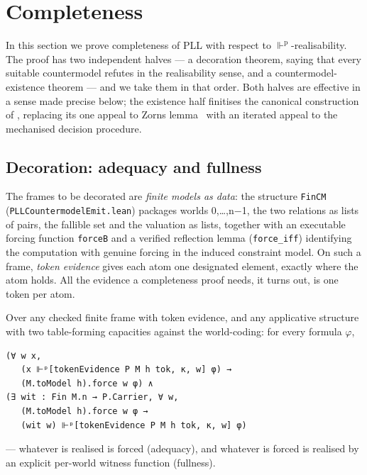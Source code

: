 \section{Completeness}\label{6-completeness}

In this section we prove completeness of PLL with respect to
\ensuremath{\Vdash^{\mathrm{p}}}-realisability. The proof has two independent halves --- a decoration
theorem, saying that every suitable countermodel refutes in the
realisability sense, and a countermodel-existence theorem --- and we take
them in that order. Both halves are effective in a sense made precise
below; the existence half finitises the canonical construction of
\cite[\S4]{FairtloughMendler1997}, replacing its one appeal to
Zorn\textquotesingle s lemma~\cite{Zorn1935} with an iterated appeal to the
mechanised decision procedure.

\subsection{Decoration: adequacy and fullness}\label{61-decoration-adequacy-and-fullness}

The frames to be decorated are \emph{finite models as data}: the structure
\texttt{FinCM} (\texttt{PLLCountermodelEmit.lean}) packages worlds 0,\ldots,n\ensuremath{-}1, the two
relations as lists of pairs, the fallible set and the valuation as
lists, together with an executable forcing function \texttt{forceB} and a
verified reflection lemma (\texttt{force\_iff}) identifying the computation
with genuine forcing in the induced constraint model. On such a frame,
\emph{token evidence} gives each atom one designated element, exactly where
the atom holds. All the evidence a completeness proof needs, it turns
out, is one token per atom.

\begin{theorem}\label{thm:adequacy-fullness}
Over any checked finite frame with token
evidence, and any applicative structure with two table-forming
capacities against the world-coding: for every formula \ensuremath{\varphi},

\begin{lstlisting}
(∀ w x,
   (x ⊩ᵖ[tokenEvidence P M h tok, κ, w] φ) →
   (M.toModel h).force w φ) ∧
(∃ wit : Fin M.n → P.Carrier, ∀ w,
   (M.toModel h).force w φ →
   (wit w) ⊩ᵖ[tokenEvidence P M h tok, κ, w] φ)
\end{lstlisting}

--- whatever is realised is forced (adequacy), and whatever is forced is
realised by an explicit per-world witness function (fullness).
\end{theorem}

